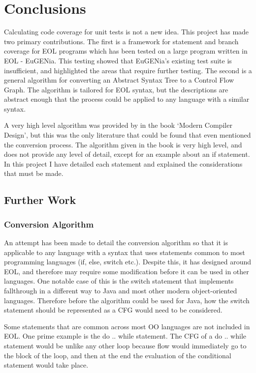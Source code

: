 \chapter{Conclusions}
\label{chap:conclusions}

Calculating code coverage for unit tests is not a new idea. This project has made two primary contributions. The first is a framework for statement and branch coverage for EOL programs which has been tested on a large program written in EOL - EuGENia. This testing showed that EuGENia's existing test suite is insufficient, and highlighted the areas that require further testing. The second is a general algorithm for converting an Abstract Syntax Tree to a Control Flow Graph. The algorithm is tailored for EOL syntax, but the descriptions are abstract enough that the process could be applied to any language with a similar syntax. 

A very high level algorithm was provided by \citet{grune2000modern} in the book `Modern Compiler Design', but this was the only literature that could be found that even mentioned the conversion process. The algorithm given in the book is very high level, and does not provide any level of detail, except for an example about an if statement. In this project I have detailed each statement and explained the considerations that must be made. 

\section{Further Work}

\subsection{Conversion Algorithm}

An attempt has been made to detail the conversion algorithm so that it is applicable to any language with a syntax that uses statements common to most programming languages (if, else, switch etc.). Despite this, it has designed around EOL, and therefore may require some modification before it can be used in other languages. One notable case of this is the switch statement that implements fallthrough in a different way to Java and most other modern object-oriented languages. Therefore before the algorithm could be used for Java, how the switch statement should be represented as a CFG would need to be considered. 

Some statements that are common across most OO languages are not included in EOL. One prime example is the do .. while statement. The CFG of a do .. while statement would be unlike any other loop because flow would immediately go to the block of the loop, and then at the end the evaluation of the conditional statement would take place.

